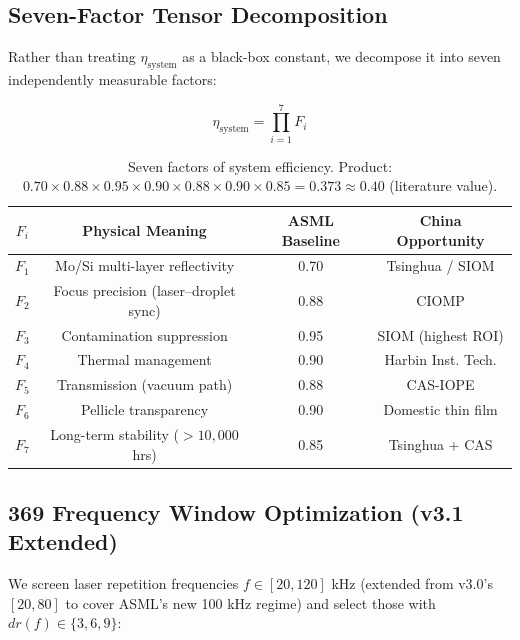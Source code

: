 \documentclass[twocolumn]{article}
\begin{document}
\subsection{Seven-Factor Tensor Decomposition}

Rather than treating $\eta_{\text{system}}$ as a black-box constant, we decompose it into seven independently measurable factors:

\[
\eta_{\text{system}} = \prod_{i=1}^{7} F_i
\]

\begin{table}[h]
\centering
\begin{tabular}{|c|c|c|c|}
\hline
$F_i$ & Physical Meaning & ASML Baseline & China Opportunity \\
\hline
$F_1$ & Mo/Si multi-layer reflectivity & 0.70 & Tsinghua / SIOM \\
$F_2$ & Focus precision (laser–droplet sync) & 0.88 & CIOMP \\
$F_3$ & Contamination suppression & 0.95 & SIOM (highest ROI) \\
$F_4$ & Thermal management & 0.90 & Harbin Inst. Tech. \\
$F_5$ & Transmission (vacuum path) & 0.88 & CAS-IOPE \\
$F_6$ & Pellicle transparency & 0.90 & Domestic thin film \\
$F_7$ & Long-term stability ($>10{,}000$ hrs) & 0.85 & Tsinghua + CAS \\
\hline
\end{tabular}
\caption{Seven factors of system efficiency. Product: $0.70 \times 0.88 \times 0.95 \times 0.90 \times 0.88 \times 0.90 \times 0.85 = 0.373 \approx 0.40$ (literature value).}
\end{table}

\subsection{369 Frequency Window Optimization (v3.1 Extended)}

We screen laser repetition frequencies $f \in [20, 120]$ kHz (extended from v3.0's $[20, 80]$ to cover ASML's new 100 kHz regime) and select those with $dr(f) \in \{3, 6, 9\}$:
\end{document}
